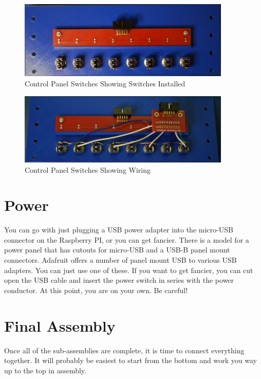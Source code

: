 \documentclass[10pt, openany]{book}
\begin{document}
\begin{figure}[ht!]
  \centering
  \includegraphics[width=0.9\textwidth]{../Pict/Switch-Installed.jpg}
  \caption{Control Panel Switches Showing Switches Installed}
  \label{fig:SwitchInstalled}
\end{figure}

\begin{figure}[ht!]
  \centering
  \includegraphics[width=0.9\textwidth]{../Pict/Switch-Wired.jpg}
  \caption{Control Panel Switches Showing Wiring}
  \label{fig:SwitchWired}
\end{figure}

\section{Power}
You can go with just plugging a USB power adapter into the micro-USB connector on the Raspberry PI, or you can get fancier.  There is a model for a power panel that has cutouts for micro-USB and a USB-B panel mount connectors.  Adafruit offers a number of panel mount USB to various USB adapters.  You can just use one of these.  If you want to get fancier, you can cut open the USB cable and insert the power switch in series with the power conductor.  At this point, you are on your own.  Be careful!

\section{Final Assembly}
Once all of the sub-assemblies are complete, it is time to connect everything together.  It will probably be easiest to start from the bottom and work you way up to the top in assembly.
\end{document}
